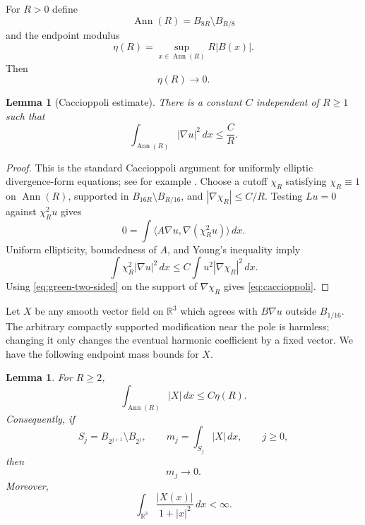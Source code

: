 \documentclass[11pt]{amsart}
\numberwithin{equation}{section}
\newtheorem{lemma}[theorem]{Lemma}
\theoremstyle{definition}
\newcommand{\R}{\mathbb R}
\newcommand{\Ann}{\operatorname{Ann}}
\newcommand{\ip}[2]{\langle #1,#2\rangle}
\newcommand{\abs}[1]{\left\lvert #1\right\rvert}
\begin{document}
For $R>0$ define
$$
        \Ann(R)=B_{8R}\setminus B_{R/8}
$$
and the endpoint modulus
\begin{equation}\label{eq:eta-R}
        \eta(R)=\sup_{x\in\Ann(R)}R\abs{B(x)}.
\end{equation}
Then
\begin{equation}\label{eq:eta-zero}
        \eta(R)\to0.
\end{equation}

\begin{lemma}[Caccioppoli estimate]\label{lem:caccioppoli}
There is a constant $C$ independent of $R\ge1$ such that
\begin{equation}\label{eq:caccioppoli}
        \int_{\Ann(R)}\abs{\nabla u}^2\,dx\le \frac{C}{R}.
\end{equation}
\end{lemma}

\begin{proof}
This is the standard Caccioppoli argument for uniformly elliptic divergence-form equations; see for example \cite[Chapter~8]{GT}.  Choose a cutoff $\chi_R$ satisfying $\chi_R\equiv1$ on $\Ann(R)$, supported in $B_{16R}\setminus B_{R/16}$, and $\abs{\nabla\chi_R}\le C/R$.  Testing $Lu=0$ against $\chi_R^2u$ gives
$$
        0=\int \ip{A\nabla u}{\nabla(\chi_R^2u)}\,dx.
$$
Uniform ellipticity, boundedness of $A$, and Young's inequality imply
$$
        \int \chi_R^2\abs{\nabla u}^2\,dx
        \le C\int u^2\abs{\nabla\chi_R}^2\,dx.
$$
Using \eqref{eq:green-two-sided} on the support of $\nabla\chi_R$ gives \eqref{eq:caccioppoli}.
\end{proof}

Let $X$ be any smooth vector field on $\R^3$ which agrees with $B\nabla u$ outside $B_{1/16}$.  The arbitrary compactly supported modification near the pole is harmless; changing it only changes the eventual harmonic coefficient by a fixed vector. We have the following endpoint mass bounds for $X$.

\begin{lemma}\label{lem:X-mass}
For $R\ge2$,
\begin{equation}\label{eq:X-annular-mass}
        \int_{\Ann(R)}\abs{X}\,dx\le C\eta(R).
\end{equation}
Consequently, if
$$
        S_j=B_{2^{j+1}}\setminus B_{2^j},\qquad
        m_j=\int_{S_j}\abs{X}\,dx,\qquad j\ge0,
$$
then
\begin{equation}\label{eq:mj-zero}
        m_j\to0.
\end{equation}
Moreover,
\begin{equation}\label{eq:weighted-X}
        \int_{\R^3}\frac{\abs{X(x)}}{1+\abs{x}^2}\,dx<\infty.
\end{equation}
\end{lemma}
\end{document}
